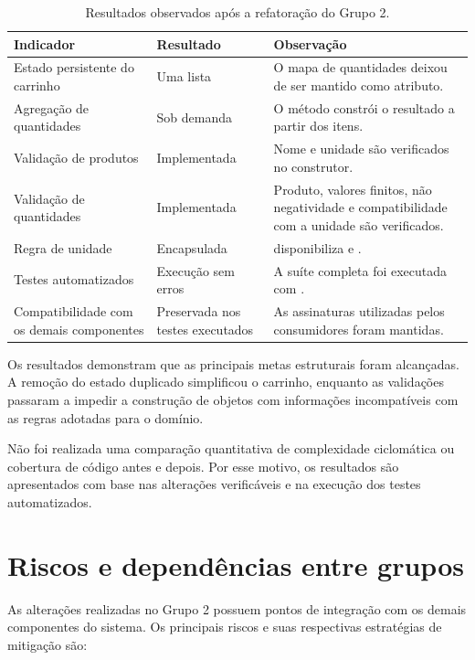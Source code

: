 \begin{table}[H]\centering\small
\begin{tabularx}{\textwidth}{>{\raggedright\arraybackslash}p{4.3cm}>{\raggedright\arraybackslash}p{3.2cm}Y}
\toprule
\textbf{Indicador} & \textbf{Resultado} & \textbf{Observação} \\
\midrule
Estado persistente do carrinho & Uma lista & O mapa de quantidades deixou de ser mantido como atributo. \\
\addlinespace
Agregação de quantidades & Sob demanda & O método  constrói o resultado a partir dos itens. \\
\addlinespace
Validação de produtos & Implementada & Nome e unidade são verificados no construtor. \\
\addlinespace
Validação de quantidades & Implementada & Produto, valores finitos, não negatividade e compatibilidade com a unidade são verificados. \\
\addlinespace
Regra de unidade & Encapsulada &  disponibiliza  e . \\
\addlinespace
Testes automatizados & Execução sem erros & A suíte completa foi executada com . \\
\addlinespace
Compatibilidade com os demais componentes & Preservada nos testes executados & As assinaturas utilizadas pelos consumidores foram mantidas. \\
\bottomrule
\end{tabularx}
\caption{Resultados observados após a refatoração do Grupo 2.}
\end{table}

Os resultados demonstram que as principais metas estruturais foram alcançadas. A remoção do estado duplicado simplificou o carrinho, enquanto as validações passaram a impedir a construção de objetos com informações incompatíveis com as regras adotadas para o domínio.

Não foi realizada uma comparação quantitativa de complexidade ciclomática ou cobertura de código antes e depois. Por esse motivo, os resultados são apresentados com base nas alterações verificáveis e na execução dos testes automatizados.

\section{Riscos e dependências entre grupos}

As alterações realizadas no Grupo 2 possuem pontos de integração com os demais componentes do sistema. Os principais riscos e suas respectivas estratégias de mitigação são:

